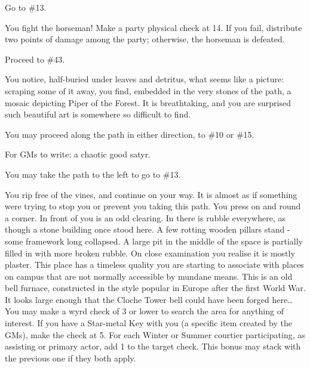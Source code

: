 \documentclass[green]{gl2018}
\begin{document}
\begin{large}
\begin{location}{30}
\begin{fromhere}Go to \#13.\end{fromhere}
\end{location}
\begin{location}{31}
You fight the horseman!  Make a party physical check at 14.  If you fail, distribute two points of damage among the party; otherwise, the horseman is defeated.
\begin{fromhere}
Proceed to \#43.
\end{fromhere}
\end{location}
\begin{location}{32}
You notice, half-buried under leaves and detritus, what seems like a picture: scraping some of it away, you find, embedded in the very stones of the path, a mosaic depicting Piper of the Forest.  It is breathtaking, and you are surprised such beautiful art is somewhere so difficult to find.
\begin{fromhere}
You may proceed along the path in either direction, to \#10 or \#15.
\end{fromhere}
\end{location}
\begin{location}{33}
For GMs to write: a chaotic good satyr.  
\begin{fromhere}You may take the path to the left to go to \#13.\end{fromhere}
\end{location}
\begin{location}{34}
You rip free of the vines, and continue on your way. It is almost as if something were trying to stop you or prevent you taking this path. You press on and round a corner. In front of you is an odd clearing. In there is rubble everywhere, as though a stone building once stood here. A few rotting wooden pillars stand - some framework long collapsed. A large pit in the middle of the space is partially filled in with more broken rubble. On close examination you realise it is mostly plaster. This place has a timeless quality you are starting to associate with places on campus that are not normally accessible by mundane means. This is an old bell furnace, constructed in the style popular in Europe after the first World War. It looks large enough that the Cloche Tower bell could have been forged here… You may make a wyrd check of 3 or lower to search the area for anything of interest. If you have a Star-metal Key with you (a specific item created by the GMs), make the check at 5. For each Winter or Summer courtier participating, as assisting or primary actor, add 1 to the target check. This bonus may stack with the previous one if they both apply. 

\end{location}
\end{large}
\end{document}
